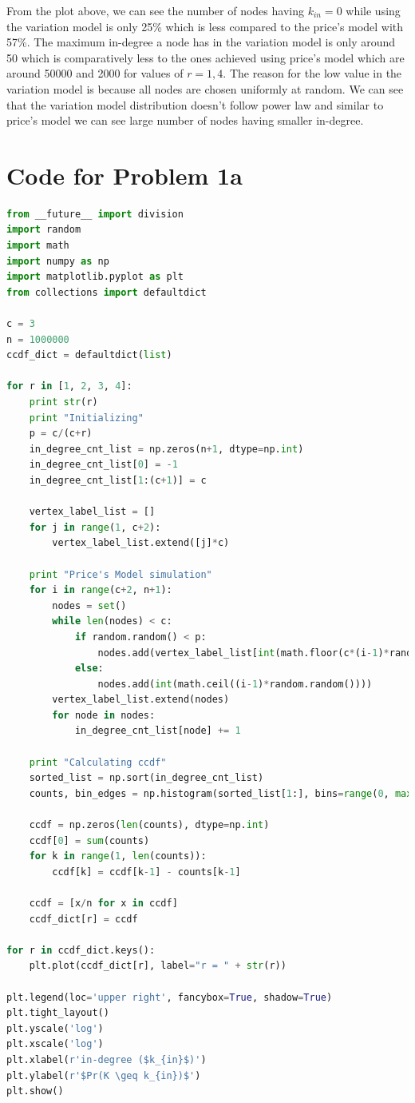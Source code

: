 \documentclass{article}
\begin{document}
From the plot above, we can see the number of nodes having $k_{in} = 0$ while using the variation model is only 25\% which is less compared to the price's model with 57\%. The maximum in-degree a node has in the variation model is only around 50 which is comparatively less to the ones achieved using price's model which are around 50000 and 2000 for values of $r=1,4$. The reason for the low value in the variation model is because all nodes are chosen uniformly at random. We can see that the variation model distribution doesn't follow power law and similar to price's model we can see large number of nodes having smaller in-degree.
 
\newpage
\section*{Code for Problem 1a}
\begin{lstlisting}[language=Python, breaklines=true] 
from __future__ import division
import random
import math
import numpy as np
import matplotlib.pyplot as plt
from collections import defaultdict

c = 3
n = 1000000
ccdf_dict = defaultdict(list)

for r in [1, 2, 3, 4]:
    print str(r)
    print "Initializing"
    p = c/(c+r)
    in_degree_cnt_list = np.zeros(n+1, dtype=np.int)
    in_degree_cnt_list[0] = -1
    in_degree_cnt_list[1:(c+1)] = c
    
    vertex_label_list = []
    for j in range(1, c+2):
        vertex_label_list.extend([j]*c)

    print "Price's Model simulation"
    for i in range(c+2, n+1):
        nodes = set()
        while len(nodes) < c:
            if random.random() < p:
                nodes.add(vertex_label_list[int(math.floor(c*(i-1)*random.random()))])
            else:
                nodes.add(int(math.ceil((i-1)*random.random())))
        vertex_label_list.extend(nodes)
        for node in nodes:
            in_degree_cnt_list[node] += 1
    
    print "Calculating ccdf"
    sorted_list = np.sort(in_degree_cnt_list)
    counts, bin_edges = np.histogram(sorted_list[1:], bins=range(0, max(sorted_list)+1))

    ccdf = np.zeros(len(counts), dtype=np.int)
    ccdf[0] = sum(counts)
    for k in range(1, len(counts)):
        ccdf[k] = ccdf[k-1] - counts[k-1]
    
    ccdf = [x/n for x in ccdf]
    ccdf_dict[r] = ccdf        

for r in ccdf_dict.keys():
    plt.plot(ccdf_dict[r], label="r = " + str(r))

plt.legend(loc='upper right', fancybox=True, shadow=True)
plt.tight_layout()
plt.yscale('log')
plt.xscale('log')
plt.xlabel(r'in-degree ($k_{in}$)')
plt.ylabel(r'$Pr(K \geq k_{in})$')
plt.show()
\end{lstlisting}
\end{document}

